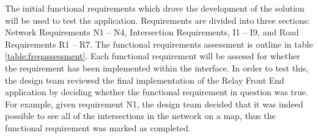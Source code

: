 \documentclass{report}
\begin{document}
The initial functional requirements which drove the development of the solution will be used to test the application. Requirements are divided into three sections: Network Requirements N1 -- N4, Intersection Requirements, I1 -- I9, and Road Requirements R1 -- R7. The functional requirements assessment is outline in table \ref{table:freqassessment}. Each functional requirement will be assesed for whether the requirement has been implemented within the interface. In order to test this, the design team reviewed the final implementation of the Relay Front End application by deciding whether the functional requirement in question was true. For example, given requirement N1, the design team decided that it was indeed possible to see all of the intersections in the network on a map, thus the functional requirement was marked as completed.
\end{document}
